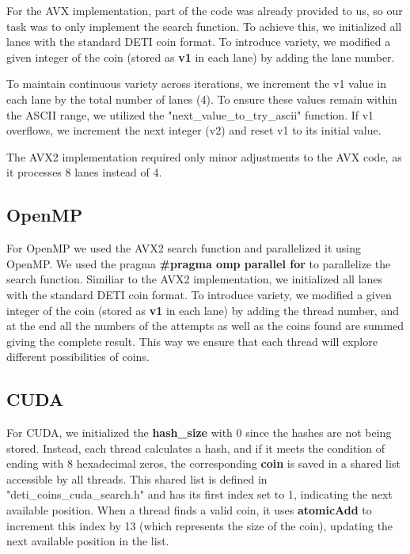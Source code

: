 \documentclass[a4paper,12pt]{article}
\begin{document}
For the AVX implementation, part of the code was already provided to us, so our task was to only implement the search function. To achieve this, we initialized all lanes with the standard DETI coin format. To introduce variety, we modified a given integer of the coin (stored as \textbf{v1} in each lane) by adding the lane number.

To maintain continuous variety across iterations, we increment the v1 value in each lane by the total number of lanes (4). To ensure these values remain within the ASCII range, we utilized the "next\_value\_to\_try\_ascii" function. If v1 overflows, we increment the next integer (v2) and reset v1 to its initial value.

The AVX2 implementation required only minor adjustments to the AVX code, as it processes 8 lanes instead of 4.


\subsection{OpenMP}
\label{subsec:openmp}

For OpenMP we used the AVX2 search function and parallelized it using OpenMP.
We used the pragma \textbf{\#pragma omp parallel for} to parallelize the 
search function.
Similiar to the AVX2 implementation, we initialized all lanes with the standard
DETI coin format. To introduce variety, we modified a given integer of the coin
(stored as \textbf{v1} in each lane) by adding the thread number,
 and at the end all the numbers of the attempts as well as the coins found are summed giving the complete result.
This way we ensure that each thread will explore different possibilities of coins.

\subsection{CUDA}
\label{subsec:cuda}

For CUDA, we initialized the \textbf{hash\_size} with 0 since the hashes are not being stored. Instead, each thread calculates a hash, and if it meets the condition of ending with 8 hexadecimal zeros, the corresponding \textbf{coin} is saved in a shared list accessible by all threads. This shared list is defined in "deti\_coins\_cuda\_search.h" and has its first index set to 1, indicating the next available position. When a thread finds a valid coin, it uses \textbf{atomicAdd} to increment this index by 13 (which represents the size of the coin), updating the next available position in the list.
\end{document}
